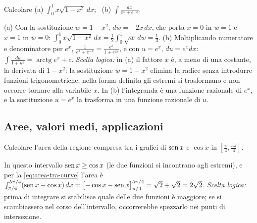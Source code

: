 \begin{esercizio}
Calcolare (a) $\int_{0}^{1}x\sqrt{1-x^{2}}\,dx$; \ (b) $\int\frac{dx}{e^{x}+e^{-x}}$.
\begin{soluzione}
(a) Con la sostituzione $w=1-x^{2}$, $dw=-2x\,dx$, che porta $x=0$ in $w=1$ e $x=1$ in $w=0$:
$\int_{0}^{1}x\sqrt{1-x^{2}}\,dx=\frac12\int_{0}^{1}\sqrt w\,dw=\frac13$. (b) Moltiplicando numeratore e
denominatore per $e^{x}$, $\frac1{e^{x}+e^{-x}}=\frac{e^{x}}{1+e^{2x}}$, e con $u=e^{x}$, $du=e^{x}dx$:
$\int\frac{du}{1+u^{2}}=\operatorname{arctg}e^{x}+c$. \emph{Scelta logica:} in (a) il fattore $x$ è,
a meno di una costante, la derivata di $1-x^{2}$: la sostituzione $w=1-x^{2}$ elimina la radice
senza introdurre funzioni trigonometriche; nella forma definita gli estremi si
trasformano e non occorre tornare alla variabile $x$. In (b) l'integranda è una funzione
razionale di $e^{x}$, e la sostituzione $u=e^{x}$ la trasforma in una funzione razionale di $u$.
\end{soluzione}
\end{esercizio}

\subsection*{Aree, valori medi, applicazioni}

\begin{esercizio}
Calcolare l'area della regione compresa tra i grafici di $\operatorname{sen} x$ e $\cos x$ in
$[\frac\pi4,\frac{5\pi}4]$.
\begin{soluzione}
In questo intervallo $\operatorname{sen} x\ge\cos x$ (le due funzioni si incontrano agli estremi), e per la
\eqref{eq:area-tra-curve} l'area è
$\int_{\pi/4}^{5\pi/4}(\operatorname{sen} x-\cos x)\,dx=\bigl[-\cos x-\operatorname{sen} x\bigr]_{\pi/4}^{5\pi/4}
=\sqrt2+\sqrt2=2\sqrt2$. \emph{Scelta logica:} prima di integrare si stabilisce quale delle
due funzioni è maggiore; se si scambiassero nel corso dell'intervallo, occorrerebbe
spezzarlo nei punti di intersezione.
\end{soluzione}
\end{esercizio}


